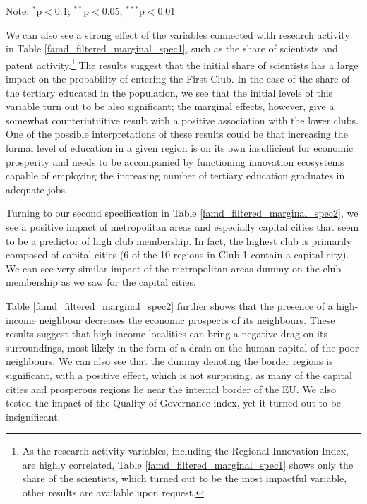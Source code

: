 \documentclass[11pt]{article}
\begin{document}
\begin{table}[!htbp]
{\begin{minipage}{\textwidth}
\begin{tablenotes}
\small 
\item Note: $^{*}$p$<$0.1; $^{**}$p$<$0.05; $^{***}$p$<$0.01
\end{tablenotes}
\end{minipage}}
\end{table} 

We can also see a strong effect of the variables connected with research activity in Table \ref{famd_filtered_marginal_spec1}, such as the share of scientists and patent activity.\footnote{As the research activity variables, including the Regional Innovation Index, are highly correlated, Table \ref{famd_filtered_marginal_spec1} shows only the share of the scientists, which turned out to be the most impactful variable, other results are available upon request.} The results suggest that the initial share of scientists has a large impact on the probability of entering the First Club. In the case of the share of the tertiary educated in the population, we see that the initial levels of this variable turn out to be also significant; the marginal effects, however, give a somewhat counterintuitive result with a positive association with the lower clubs. One of the possible interpretations of these results could be that increasing the formal level of education in a given region is on its own insufficient for economic prosperity and needs to be accompanied by functioning innovation ecosystems capable of employing the increasing number of tertiary education graduates in adequate jobs.

Turning to our second specification in Table \ref{famd_filtered_marginal_spec2}, we see a positive impact of metropolitan areas and especially capital cities that seem to be a predictor of high club membership. In fact, the highest club is primarily composed of capital cities (6 of the 10 regions in Club 1 contain a capital city).  We can see very similar impact of the metropolitan areas dummy on the club membership as we saw for the capital cities.

Table \ref{famd_filtered_marginal_spec2} further shows that the presence of a high-income neighbour decreases the economic prospects of its neighbours. These results suggest that high-income localities can bring a negative drag on its surroundings, most likely in the form of a drain on the human capital of the poor neighbours. We can also see that the dummy denoting the border regions is significant, with a positive effect, which is not surprising, as many of the capital cities and prosperous regions lie near the internal border of the EU. We also tested the impact of the Quality of Governance index, yet it turned out to be insignificant.
\end{document}
